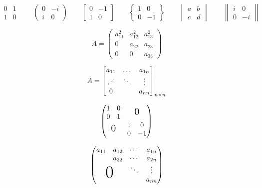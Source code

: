 \documentclass{ctexart}%
\newcommand{\adots}{\mathinner{\mkern2mu%
		\raisebox{0.1em}{.}\mkern2mu\raisebox{0.4em}{.}%
		\mkern2mu\raisebox{0.7em}{.}\mkern1mu}}
\begin{document}
	\[
	\begin{matrix}
		0 & 1 \\
		1 & 0
	\end{matrix} \qquad
	\begin{pmatrix}
	0 & -i \\
	i & 0
	\end{pmatrix} \qquad
	\begin{bmatrix}
	0 & -1 \\
	1 & 0
	\end{bmatrix} \qquad
	\begin{Bmatrix}
	1 & 0 \\
	0 & -1
	\end{Bmatrix} \qquad
	\begin{vmatrix}
	a & b \\
	c & d
	\end{vmatrix} \qquad
	\begin{Vmatrix}
	i & 0 \\
	0 & -i
	\end{Vmatrix} 
	\]
	
	\[
	A = \begin{pmatrix}
	a_{11}^2 & a_{12}^2 & a_{13}^2 \\
	0 & a_{22} & a_{23} \\
	0 & 0 & a_{33}
	\end{pmatrix}
	\]
	
	\[
	A = \begin{bmatrix}
	a_{11} & \dots & a_{1n} \\
	\adots & \ddots & \vdots \\
	0 & & a_{nn}
	\end{bmatrix}_{n \times n}
	\]
	
	\[
	\begin{pmatrix}
	\begin{matrix} 1&0\\0&1 \end{matrix}
	& \text{\Large 0} \\
	\text{\Large 0} & \begin{matrix}
	1&0\\0&-1 \end{matrix}
	\end{pmatrix}
	\]
	
	\[
	\begin{pmatrix}
	a_{11} & a_{12} & \cdots & a_{1n} \\
	& a_{22} & \cdots & a_{2n} \\
	&		 & \ddots & \vdots \\
	\multicolumn{2}{c}{\raisebox{1.3ex}[0pt]{\Huge 0}}
	&		 &a_{nn}
	\end{pmatrix}
	\]
	
\end{document}
